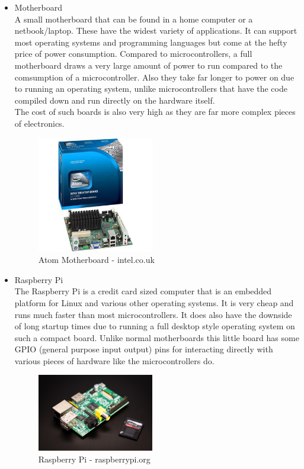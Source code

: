 \begin{itemize}
\item Motherboard
\\A small motherboard that can be found in a home computer or a netbook/laptop.  These have the widest variety of applications.  It can support most operating systems and programming languages but come at the hefty price of power consumption.  Compared to microcontrollers, a full motherboard draws a very large amount of power to run compared to the comsumption of a microcontroller.  Also they take far longer to power on due to running an operating system, unlike microcontrollers that have the code compiled down and run directly on the hardware itself.
\\The cost of such boards is also very high as they are far more complex pieces of electronics.
\begin{figure}[h]
\centering
        \includegraphics[width=2.0in] {Images/atom.jpg}
        \caption{Atom Motherboard - intel.co.uk}
        \label{Atom Motherboard}
\end{figure}
\item Raspberry Pi
\\The Raspberry Pi is a credit card sized computer that is an embedded platform for Linux and various other operating systems.  It is very cheap and runs much faster than most microcontrollers.  It does also have the downside of long startup times due to running a full desktop style operating system on such a compact board.  Unlike normal motherboards this little board has some GPIO (general purpose input output) pins for interacting directly with various pieces of hardware like the microcontrollers do.
\begin{figure}[h]
\centering
        \includegraphics[width=2.0in] {Images/rpi.jpeg}
        \caption{Raspberry Pi - raspberrypi.org}
        \label{Raspberry Pi}
\end{figure}

\end{itemize}

